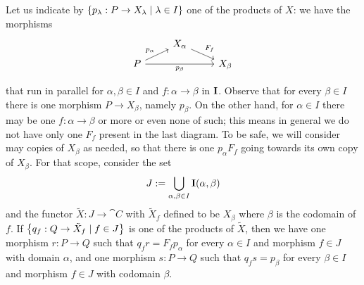 Let us indicate by
\(\left\{p_\lambda : P \to X_\lambda \mid \lambda \in I\right\}\) one of the products of
\(X\): we have the morphisms
\[\begin{tikzcd}[row sep=tiny]
    & X_\alpha \ar["{F_f}", dr] \\
    P \ar["{p_\alpha}", ur] \ar["{p_\beta}", rr, swap] & & X_\beta
    \\ %
  \end{tikzcd}\] that run in parallel for \(\alpha, \beta \in I\) and
\(f : \alpha \to \beta\) in \({\bf I}\). Observe that for every
\(\beta \in I\) there is one morphism \(P \to X_\beta\), namely
\(p_\beta\). On the other hand, for \(\alpha \in I\) there may be one
\(f : \alpha \to \beta\) or more or even none of such; this means in general we
do not have only one \(F_f\) present in the last diagram. To be safe,
we will consider may copies of \(X_\beta\) as needed, so that there is one
\(p_\alpha F_f\) going towards its own copy of \(X_\beta\).  For that scope, consider the set
\[J := \bigcup_{\alpha, \beta \in I} {\bf I}(\alpha, \beta)\] and the functor
\(\tilde X : J \to \cat C\) with \(\tilde X_f\) defined to be
\(X_\beta\) where \(\beta\) is the codomain of \(f\). If
\(\left\{q_f : Q \to \tilde X_f \mid f \in J\right\}\) is one of the products of
\(\tilde X\), then we have one morphism \(r : P \to Q\) such that
\(q_f r = F_f p_\alpha\) for every \(\alpha \in I\) and morphism
\(f \in J\) with domain \(\alpha\), and one morphism \(s : P \to Q\) such that
\(q_f s = p_\beta\) for every \(\beta \in I\) and morphism \(f \in J\) with
codomain \(\beta\).

